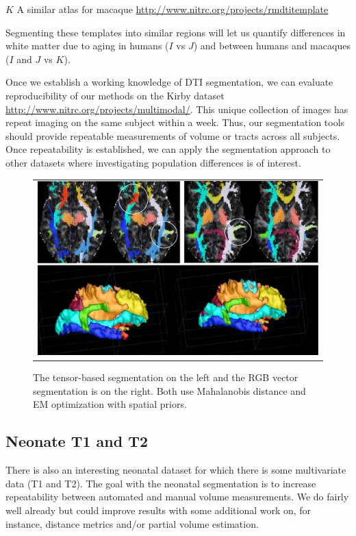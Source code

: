 \documentclass[11pt,english]{article}
\begin{document}
\noindent $K$ A similar atlas for macaque \url{http://www.nitrc.org/projects/rmdtitemplate}

Segmenting these templates into similar regions will let us quantify
differences in white matter due to aging in humans ($I$ vs $J$) and
between humans and macaques ($I$ and $J$ vs $K$).

Once we establish a working knowledge of DTI segmentation, we can
evaluate reproducibility of our methods on the Kirby dataset
\url{http://www.nitrc.org/projects/multimodal/}.  This unique
collection of images has repeat imaging on the same subject within a
week.  Thus, our segmentation tools should provide repeatable
measurements of volume or tracts across all subjects.  Once
repeatability is established, we can apply the segmentation approach
to other datasets where investigating population differences is of
interest.

\begin{figure}
\begin{center}
\begin{tabular}{c}
\includegraphics[width=6in]{Figures/004_vec_vs_dti.pdf}
\end{tabular}
\caption{The tensor-based segmentation on the left and the
  RGB vector segmentation is on the right.  Both use Mahalanobis
  distance and EM optimization with spatial priors.}
\label{fig:example1}
\end{center}
\end{figure}

\subsection{Neonate T1 and T2} There is also an interesting neonatal
dataset for which there is some multivariate data (T1 and T2).  The
goal with the neonatal segmentation is to increase repeatability
between automated and manual volume measurements.  We do fairly well
already but could improve results with some additional work on, for
instance, distance metrics and/or partial volume estimation.
\end{document}

